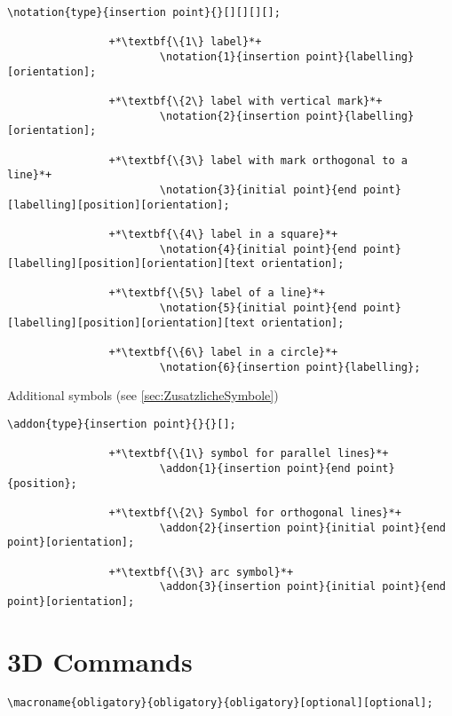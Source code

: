 \documentclass[%
  a4paper,
  BCOR20mm,
  pointlessnumbers,
  twoside,
  halfparskip,
  openright,
]{scrreprt}
\begin{document}
\begin{lstlisting}[emph={notation},backgroundcolor=\color{white}]
		\notation{type}{insertion point}{}[][][][];
		
				+*\textbf{\{1\} label}*+
						\notation{1}{insertion point}{labelling}[orientation];
						
				+*\textbf{\{2\} label with vertical mark}*+
						\notation{2}{insertion point}{labelling}[orientation];
						
				+*\textbf{\{3\} label with mark orthogonal to a line}*+
						\notation{3}{initial point}{end point}[labelling][position][orientation];
						
				+*\textbf{\{4\} label in a square}*+
						\notation{4}{initial point}{end point}[labelling][position][orientation][text orientation];
						
				+*\textbf{\{5\} label of a line}*+
						\notation{5}{initial point}{end point}[labelling][position][orientation][text orientation];
						
				+*\textbf{\{6\} label in a circle}*+
						\notation{6}{insertion point}{labelling};
\end{lstlisting}\vspace{-10mm}

Additional symbols (see \ref{sec:ZusatzlicheSymbole})

\begin{lstlisting}[emph={addon},backgroundcolor=\color{white}]
		\addon{type}{insertion point}{}{}[];
		
				+*\textbf{\{1\} symbol for parallel lines}*+
						\addon{1}{insertion point}{end point}{position};
						
				+*\textbf{\{2\} Symbol for orthogonal lines}*+
						\addon{2}{insertion point}{initial point}{end point}[orientation];
				
				+*\textbf{\{3\} arc symbol}*+
						\addon{3}{insertion point}{initial point}{end point}[orientation];
\end{lstlisting}\vspace{-10mm}

\newpage
\section{3D Commands}
\label{sec:3dcom}

\begin{lstlisting}[emph={macroname},backgroundcolor=\color{red!10}]
		\macroname{obligatory}{obligatory}{obligatory}[optional][optional];
\end{lstlisting}\vspace{-7mm}
\end{document}
